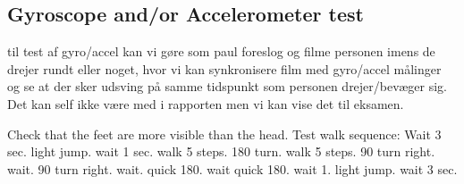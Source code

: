 \subsection{Gyroscope and/or Accelerometer test}
til test af gyro/accel kan vi gøre som paul foreslog og filme personen imens de drejer rundt eller noget, hvor vi kan synkronisere film med gyro/accel målinger og se at der sker udsving på samme tidspunkt som personen drejer/bevæger sig. Det kan self ikke være med i rapporten men vi kan vise det til eksamen. 


Check that the feet are more visible than the head. 
Test walk sequence: Wait 3 sec. light jump. wait 1 sec. walk 5 steps. 180 turn. walk 5 steps. 90 turn right. wait. 90 turn right. wait. quick 180. wait quick 180. wait 1. light jump. wait 3 sec. 